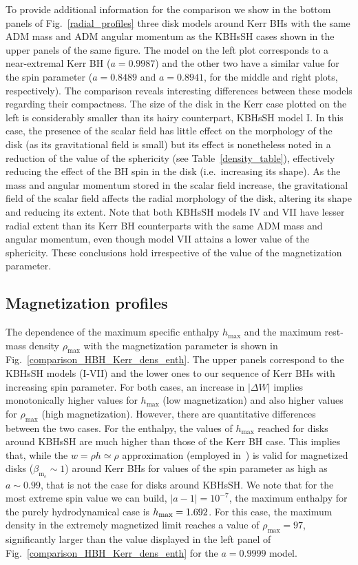 \documentclass[twocolumn,aps,showpacs,showkeys,prd,superscriptaddress,byrevtex, amsmath]{revtex4-1}
\begin{document}
To provide additional information for the comparison we show in the bottom panels of Fig.~\ref{radial_profiles} three disk models around Kerr BHs  with the same ADM mass and ADM angular momentum as the KBHsSH cases shown in the upper panels of the same figure. The model on the left plot corresponds to a near-extremal Kerr BH ($a=0.9987$) and the other two have a similar value for the  spin parameter ($a=0.8489$ and $a=0.8941$, for the middle and right plots, respectively). The comparison reveals interesting differences between these models regarding their compactness. The size of the disk in the Kerr case plotted on the left is considerably smaller than its hairy counterpart, KBHsSH model I. In this case, the presence of the scalar field has little effect on the morphology of the disk (as its gravitational field is small) but its effect is nonetheless noted in a reduction of the value of the sphericity (see Table~\ref{density_table}), effectively reducing the effect of the BH spin in the disk (i.e.~increasing its shape). As the mass and angular momentum stored in the scalar field increase, the gravitational field of the scalar field affects the radial morphology of the disk, altering its shape and reducing its extent. Note that both KBHsSH models IV and VII have lesser radial extent than its Kerr BH counterparts with the same ADM mass and angular momentum, even though model VII attains a lower value of the sphericity. These conclusions hold irrespective of the value of the magnetization parameter.

\subsection{Magnetization profiles}

The dependence of the maximum specific enthalpy $h_{\mathrm{max}}$ and the maximum rest-mass density $\rho_{\mathrm{max}}$ with the magnetization parameter is shown in Fig.~\ref{comparison_HBH_Kerr_dens_enth}. The upper panels correspond to the KBHsSH models (I-VII) and the lower ones to our sequence of Kerr BHs with increasing spin parameter. For both cases, an increase in $|\Delta W|$ implies monotonically  higher values for $h_{\mathrm{max}}$ (low magnetization) and also higher values for $\rho_{\mathrm{max}}$ (high magnetization). However, there are quantitative differences between the two cases. For the enthalpy, the values of $h_{\mathrm{max}}$ reached for disks around KBHsSH are much higher than those of the Kerr BH case. This implies that, while the $w = \rho h \simeq \rho$ approximation (employed in~\cite{Komissarov:2006,Gimeno-Soler:2017}) is valid for magnetized disks ($\beta_{\mathrm{m_c}} \sim 1$) around Kerr BHs for values of the spin parameter as high as $a \sim 0.99$, that is not the case for disks around KBHsSH. We note that for the most extreme spin value we can build, $|a-1|=10^{-7}$, the maximum enthalpy for the purely hydrodynamical case is $h_{\rm max}=1.692$. For this case, the maximum density in the extremely magnetized limit reaches a value of $\rho_{\mathrm{max}} = 97$, significantly larger than the value displayed in the left  panel of Fig.~\ref{comparison_HBH_Kerr_dens_enth} for the $a=0.9999$ model.
\end{document}
